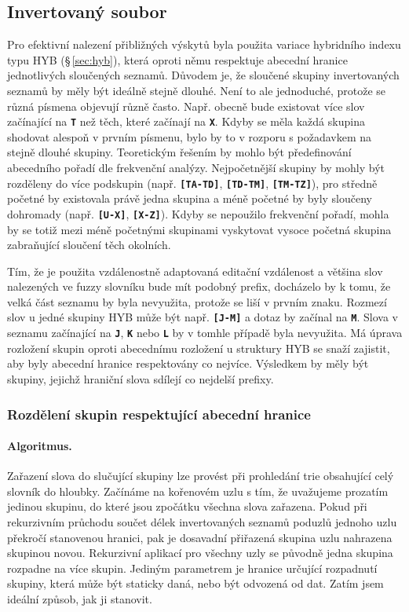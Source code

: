 \documentclass[11pt,letterpaper,oneside,openright]{book}
\newcommand{\bftt}[1]{\texttt{\textbf{#1}}}
\begin{document}
\subsection{Invertovaný soubor}
Pro efektivní nalezení přibližných výskytů byla použita variace hybridního
indexu typu HYB (\S\,\ref{sec:hyb}), která oproti němu respektuje abecední
hranice jednotlivých sloučených seznamů. Důvodem je, že sloučené skupiny
invertovaných seznamů by měly být ideálně stejně dlouhé. Není to ale
jednoduché, protože se různá písmena objevují různě často. Např. obecně bude
existovat více slov začínající na \bftt{T} než těch, které začínají na
\bftt{X}. Kdyby se měla každá skupina shodovat alespoň v prvním písmenu, bylo
by to v rozporu s požadavkem na stejně dlouhé skupiny. Teoretickým řešením by
mohlo být předefinování abecedního pořadí dle frekvenční analýzy. Nejpočetnější
skupiny by mohly být rozděleny do více podskupin (např. \bftt{[TA-TD]},
\bftt{[TD-TM]}, \bftt{[TM-TZ]}), pro středně početné by existovala právě jedna
skupina a méně početné by byly sloučeny dohromady (např. \bftt{[U-X]},
\bftt{[X-Z]}). Kdyby se nepoužilo frekvenční pořadí, mohla by se totiž mezi méně
početnými skupinami vyskytovat vysoce početná skupina zabraňující sloučení těch
okolních.

Tím, že je použita vzdálenostně adaptovaná editační vzdálenost a většina slov
nalezených ve fuzzy slovníku bude mít podobný prefix, docházelo by k tomu, že
velká část seznamu by byla nevyužita, protože se liší v prvním znaku. Rozmezí
slov u jedné skupiny HYB může být např. \bftt{[J-M]} a dotaz by začínal na
\bftt{M}. Slova v seznamu začínající na \bftt{J}, \bftt{K} nebo \bftt{L} by v
tomhle případě byla nevyužita. Má úprava rozložení skupin oproti abecednímu
rozložení u struktury HYB se snaží zajistit, aby byly abecední hranice
respektovány co nejvíce. Výsledkem by měly být skupiny, jejichž hraniční slova
sdílejí co nejdelší prefixy.

\subsubsection{Rozdělení skupin respektující abecední hranice} \label{sec:hybrid_algorithm}
\paragraph{Algoritmus.} Zařazení slova do slučující skupiny lze provést při
prohledání trie obsahující celý slovník do hloubky. Začínáme na kořenovém uzlu
s tím, že uvažujeme prozatím jedinou skupinu, do které jsou zpočátku všechna
slova zařazena.  Pokud při rekurzivním průchodu součet délek invertovaných
seznamů poduzlů jednoho uzlu překročí stanovenou hranici, pak je dosavadní
přiřazená skupina uzlu nahrazena skupinou novou. Rekurzivní aplikací pro
všechny uzly se původně jedna skupina rozpadne na více skupin. Jediným
parametrem je hranice určující rozpadnutí skupiny, která může být staticky
daná, nebo být odvozená od dat. Zatím jsem ideální způsob, jak ji stanovit.
\end{document}

